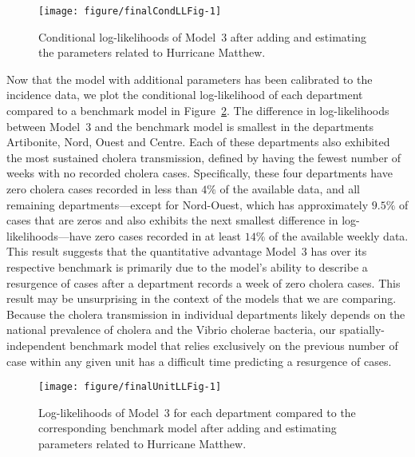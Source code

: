 \begin{figure}[!ht]
\begin{knitrout}
\color{fgcolor}
\texttt{[image: figure/finalCondLLFig-1]} 
\end{knitrout}
\caption[Conditional log-likelihoods with hurricane adjustment]{\label{fig:finalCondLL}Conditional log-likelihoods of Model~3 after adding and estimating the parameters related to Hurricane Matthew.}
\end{figure}

Now that the model with additional parameters has been calibrated to the incidence data, we plot the conditional log-likelihood of each department compared to a benchmark model in Figure~\ref{fig:finalUnitLL}.
The difference in log-likelihoods between Model~3 and the benchmark model is smallest in the departments Artibonite, Nord, Ouest and Centre.
Each of these departments also exhibited the most sustained cholera transmission, defined by having the fewest number of weeks with no recorded cholera cases.
Specifically, these four departments have zero cholera cases recorded in less than $4\%$ of the available data, and all remaining departments---except for Nord-Ouest, which has approximately $9.5\%$ of cases that are zeros and also exhibits the next smallest difference in log-likelihoods---have zero cases recorded in at least $14\%$ of the available weekly data.
This result suggests that the quantitative advantage Model~3 has over its respective benchmark is primarily due to the model's ability to describe a resurgence of cases after a department records a week of zero cholera cases.
This result may be unsurprising in the context of the models that we are comparing.
Because the cholera transmission in individual departments likely depends on the national prevalence of cholera and the Vibrio cholerae bacteria, our spatially-independent benchmark model that relies exclusively on the previous number of case within any given unit has a difficult time predicting a resurgence of cases.

\begin{figure}[!ht]
\begin{knitrout}
\color{fgcolor}
\texttt{[image: figure/finalUnitLLFig-1]} 
\end{knitrout}
\caption{\label{fig:finalUnitLL}Log-likelihoods of Model~3 for each department compared to the corresponding benchmark model after adding and estimating parameters related to Hurricane Matthew.}
\end{figure}

